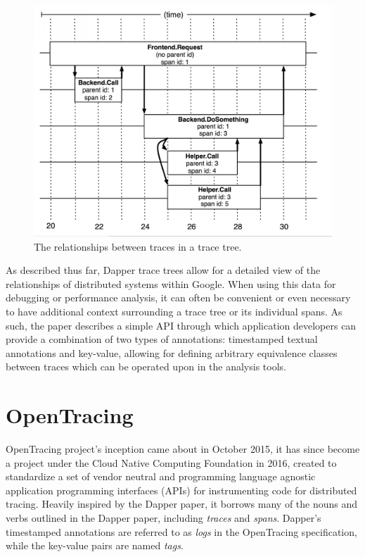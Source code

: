 \documentclass[12pt,pdftex,titlepage]{report}
\begin{document}
        \begin{figure}[htb!]
            \centering
            \includegraphics[scale=0.9]{dappertrace}
            \caption{The relationships between traces in a trace tree.}
            \label{fig:dappertrace}
        \end{figure}

        As described thus far, Dapper trace trees allow for a detailed view of the relationships of distributed systems within
        Google. When using this data for debugging or performance analysis, it can often be convenient or even necessary to 
        have additional context surrounding a trace tree or its individual spans. As such, the paper describes a simple API 
        through which application developers can provide a combination of two types of annotations: timestamped textual annotations
        and key-value, allowing for defining arbitrary equivalence classes between traces which can be operated upon in the analysis
        tools.

        \section{OpenTracing}
        OpenTracing\cite{opentracing} project's inception came about in October 2015, it has since become a project under the 
        Cloud Native Computing Foundation in 2016, created to standardize a set of vendor neutral and programming language agnostic
        application programming interfaces (APIs) for instrumenting code for distributed tracing. Heavily inspired by the Dapper
        paper, it borrows many of the nouns and verbs outlined in the Dapper paper, including \textit{traces} and \textit{spans}.
        Dapper's timestamped annotations are referred to as \textit{logs} in the OpenTracing specification, while the key-value pairs
        are named \textit{tags}. 
\end{document}
